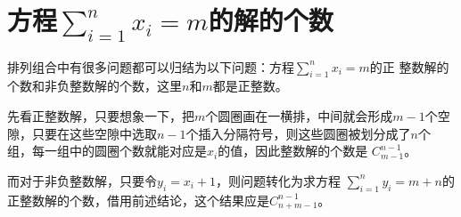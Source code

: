 
\section{方程$\sum_{i=1}^nx_i=m$的解的个数}
\label{sec:solve-number-of-equation}

排列组合中有很多问题都可以归结为以下问题：方程$\sum_{i=1}^nx_i=m$的正
整数解的个数和非负整数解的个数，这里$n$和$m$都是正整数。

先看正整数解，只要想象一下，把$m$个圆圈画在一横排，中间就会形成$m-1$个空
隙，只要在这些空隙中选取$n-1$个插入分隔符号，则这些圆圈被划分成了$n$个
组，每一组中的圆圈个数就能对应是$x_i$的值，因此整数解的个数是
$C_{m-1}^{n-1}$。

而对于非负整数解，只要令$y_i=x_i+1$，则问题转化为求方程
$\sum_{i=1}^ny_i=m+n$的正整数解的个数，借用前述结论，这个结果应是$C_{n+m-1}^{n-1}$。